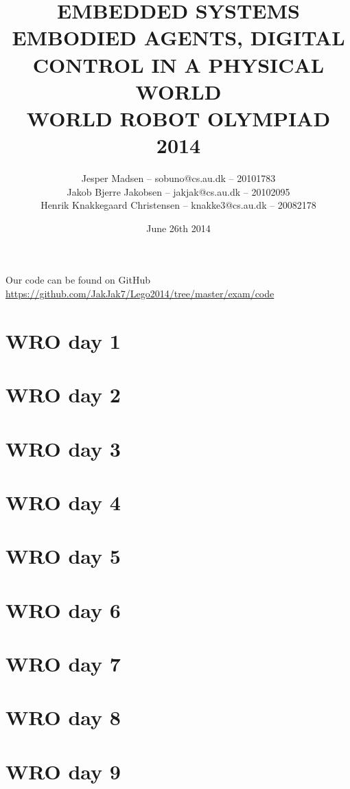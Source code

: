 \documentclass[a4paper,11pt,article,oneside]{memoir}
\title{EMBEDDED SYSTEMS\\\small{EMBODIED AGENTS, DIGITAL CONTROL IN A PHYSICAL WORLD\\WORLD ROBOT OLYMPIAD 2014}}
\author{Jesper Madsen -- sobuno@cs.au.dk -- 20101783\\Jakob Bjerre Jakobsen -- jakjak@cs.au.dk -- 20102095\\Henrik Knakkegaard Christensen -- knakke3@cs.au.dk -- 20082178}
\date{June 26th 2014}
\newcommand\blankpage{%
    \null
    \thispagestyle{empty}%
    \addtocounter{page}{-1}%
    \newpage}
\begin{document}
\maketitle
\thispagestyle{empty}
\afterpage{\blankpage}
\newpage
Our code can be found on GitHub\\
\url{https://github.com/JakJak7/Lego2014/tree/master/exam/code}
\newpage
\setcounter{tocdepth}{2}
\tableofcontents
\afterpage{\blankpage}
\newpage

\section{WRO day 1}

\clearpage
\section{WRO day 2}

\clearpage
\section{WRO day 3}

\clearpage
\section{WRO day 4}

\clearpage
\section{WRO day 5}

\clearpage
\section{WRO day 6}

\clearpage
\section{WRO day 7}

\clearpage
\section{WRO day 8}

\clearpage
\section{WRO day 9}

\clearpage
\end{document}
